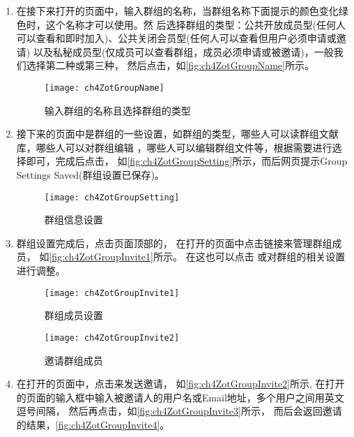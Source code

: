 \documentclass[cn,11pt,chinese]{elegantbook}
\begin{document}
\begin{enumerate}
	\item 在接下来打开的页面中，输入群组的名称，当群组名称下面提示的颜色变化绿色时，这个名称才可以使用。然
	后选择群组的类型：公共开放成员型(任何人可以查看和即时加入)、公共关闭会员型(任何人可以查看但用户必须申请或邀请)
	以及私秘成员型(仅成员可以查看群组，成员必须申请或被邀请)，一般我们选择第二种或第三种，
	然后点击，如\autoref{fig:ch4ZotGroupName}所示。
	\begin{figure}[htbp]
		\centering
		\texttt{[image: ch4ZotGroupName]}
		\caption{输入群组的名称且选择群组的类型}
		\label{fig:ch4ZotGroupName}
	\end{figure}
	\item 接下来的页面中是群组的一些设置，如群组的类型，哪些人可以读群组文献库，哪些人可以对群组编辑
	，哪些人可以编辑群组文件等，根据需要进行选择即可，完成后点击，
	如\autoref{fig:ch4ZotGroupSetting}所示，而后网页提示Group Settings Saved(群组设置已保存)。
	\begin{figure}[htbp]
		\centering
		\texttt{[image: ch4ZotGroupSetting]}
		\caption{群组信息设置}
		\label{fig:ch4ZotGroupSetting}
	\end{figure}
	\item 群组设置完成后，点击页面顶部的，
	在打开的页面中点击链接来管理群组成员，
	如\autoref{fig:ch4ZotGroupInvite1}所示。
	在这也可以点击
	或对群组的相关设置进行调整。
	\begin{figure}[htbp]
		\centering
		\begin{minipage}[t]{\dimexpr.5\textwidth-1em}
			\centering
			\texttt{[image: ch4ZotGroupInvite1]}
			\caption{群组成员设置}
			\label{fig:ch4ZotGroupInvite1}
		\end{minipage}
		\begin{minipage}[t]{\dimexpr.5\textwidth-1em}
			\centering
			\texttt{[image: ch4ZotGroupInvite2]}
			\caption{邀请群组成员}
			\label{fig:ch4ZotGroupInvite2}	
		\end{minipage}	 
	\end{figure}
	\item 在打开的页面中，点击来发送邀请，
	如\autoref{fig:ch4ZotGroupInvite2}所示,
	在打开的页面的输入框中输入被邀请人的用户名或Email地址，多个用户之间用英文逗号间隔，
	然后再点击，如\autoref{fig:ch4ZotGroupInvite3}所示，
	而后会返回邀请的结果，\autoref{fig:ch4ZotGroupInvite4}。

\end{enumerate}
\end{document}
